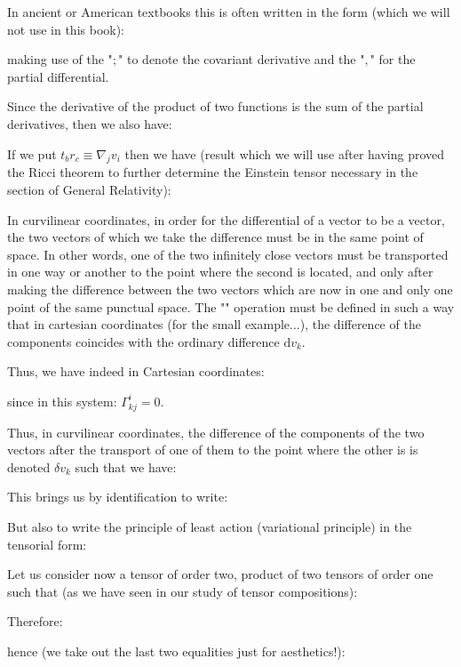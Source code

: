 	\begin{tcolorbox}[title=Remark,colframe=black,arc=10pt]
	In ancient or American textbooks this is often written in the form (which we will not use in this book):
	
	making use of the "$;$" to denote the covariant derivative and the "$,$" for the partial differential.
	\end{tcolorbox}
	Since the derivative of the product of two functions is the sum of the partial derivatives, then we also have:
	
	If we put $t_br_c\equiv \nabla_j v_i$ then we have (result which we will use after having proved the Ricci theorem to further determine the Einstein tensor necessary in the section of General Relativity):
	
	In curvilinear coordinates, in order for the differential of a vector to be a vector, the two vectors of which we take the difference must be in the same point of space. In other words, one of the two infinitely close vectors must be transported in one way or another to the point where the second is located, and only after making the difference between the two vectors which are now in one and only one point of the same punctual space. The "" operation must be defined in such a way that in cartesian coordinates (for the small example...), the difference of the components coincides with the ordinary difference $\mathrm{d}v_k$. 
	
	Thus, we have indeed in Cartesian coordinates:
	
	since in this system: $\Gamma_{kj}^i=0$.
	
	Thus, in curvilinear coordinates, the difference of the components of the two vectors after the transport of one of them to the point where the other is is denoted $\delta v_k$ such that we have:
	
	This brings us by identification to write:
	
	But also to write the principle of least action (variational principle) in the tensorial form:
	
	Let us consider now a tensor of order two, product of two tensors of order one such that (as we have seen in our study of tensor compositions):
	
	Therefore:
	
	hence (we take out the last two equalities just for aesthetics!):
	
